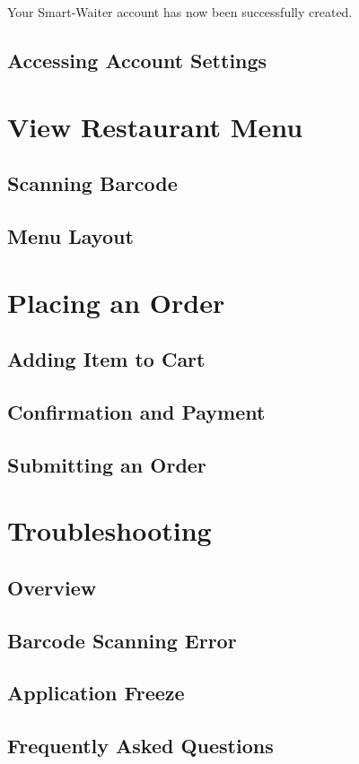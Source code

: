 \documentclass[12pt, titlepage]{article}
\begin{document}
Your Smart-Waiter account has now been successfully created.
\subsection{Accessing Account Settings}

\section{View Restaurant Menu}
\subsection{Scanning Barcode}
\subsection{Menu Layout}

\section{Placing an Order}
\subsection{Adding Item to Cart}
\subsection{Confirmation and Payment}
\subsection{Submitting an Order}

\section{Troubleshooting}
\subsection{Overview}
\subsection{Barcode Scanning Error}
\subsection{Application Freeze}
\subsection{Frequently Asked Questions}
\end{document}
